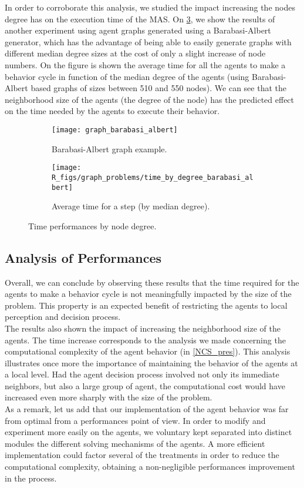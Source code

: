 In order to corroborate this analysis, we studied the impact increasing the nodes degree has on the execution time of the MAS. On \figurename{} \ref{experiment_degrees}, we show the results of another experiment using agent graphs generated using a Barabasi-Albert generator, which has the advantage of being able to easily generate graphs with different median degree sizes at the cost of only a slight increase of node numbers. On the figure is shown the average time for all the agents to make a behavior cycle in function of the median degree of the agents (using Barabasi-Albert based graphs of sizes between 510 and 550 nodes). We can see that the neighborhood size of the agents (the degree of the node) has the predicted effect on the time needed by the agents to execute their behavior.

\begin{figure}
\centering
	\begin{subfigure}[b]{0.45\textwidth}
		\texttt{[image: graph\_barabasi\_albert]}
		\caption{Barabasi-Albert graph example.}\label{experiment_degrees:graph}
	\end{subfigure}
	\begin{subfigure}[b]{0.45\textwidth}
			\texttt{[image: R\_figs/graph\_problems/time\_by\_degree\_barabasi\_albert]}
		\caption{Average time for a step (by median degree).}\label{experiment_degrees:res}
	\end{subfigure}
\caption{Time performances by node degree.}
\label{experiment_degrees}
\end{figure}

\subsection{Analysis of Performances}

Overall, we can conclude by observing these results that the time required for the agents to make a behavior cycle is not meaningfully impacted by the size of the problem. This property is an expected benefit of restricting the agents to local perception and decision process.\\
The results also shown the impact of increasing the neighborhood size of the agents. The time increase corresponds to the analysis we made concerning the computational complexity of the agent behavior (in \ref{NCS_pres}). This analysis illustrates once more the importance of maintaining the behavior of the agents at a local level. Had the agent decision process involved not only its immediate neighbors, but also a large group of agent, the computational cost would have increased even more sharply with the size of the problem.\\
As a remark, let us add that our implementation of the agent behavior was far from optimal from a performances point of view. In order to modify and experiment more easily on the agents, we voluntary kept separated into distinct modules the different solving mechanisms of the agents. A more efficient implementation could factor several of the treatments in order to reduce the computational complexity, obtaining a non-negligible performances improvement in the process.

